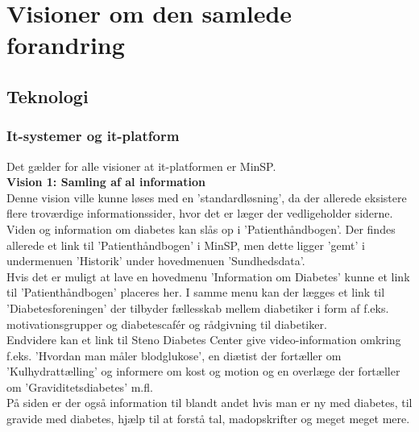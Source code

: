 \section{Visioner om den samlede forandring}
\subsection{Teknologi}
%
%
\subsubsection{It-systemer og it-platform}
Det gælder for alle visioner at it-platformen er MinSP.\\
\textbf{Vision 1: Samling af al information} \\
 Denne vision ville kunne løses med en 'standardløsning', da der allerede eksistere flere troværdige informationssider, hvor det er læger der vedligeholder siderne. \\
 Viden og information om diabetes kan slås op i 'Patienthåndbogen'. Der findes allerede et link til 'Patienthåndbogen' i MinSP, men dette ligger 'gemt' i undermenuen 'Historik' under hovedmenuen 'Sundhedsdata'.\\
 Hvis det er muligt at lave en hovedmenu 'Information om Diabetes' kunne et link til 'Patienthåndbogen' placeres her. I samme menu kan der lægges et link til 'Diabetesforeningen' der tilbyder fællesskab mellem diabetiker i form af f.eks. motivationsgrupper og diabetescafér og rådgivning til diabetiker.\\
 Endvidere kan et link til Steno Diabetes Center give video-information omkring f.eks. 'Hvordan man måler blodglukose', en diætist der fortæller om 'Kulhydrattælling' og informere om kost og motion og en overlæge der fortæller om 'Graviditetsdiabetes' m.fl. \\
 På siden er der også information til blandt andet hvis man er ny med diabetes, til gravide med diabetes, hjælp til at forstå tal, madopskrifter og meget meget mere. \\ 

